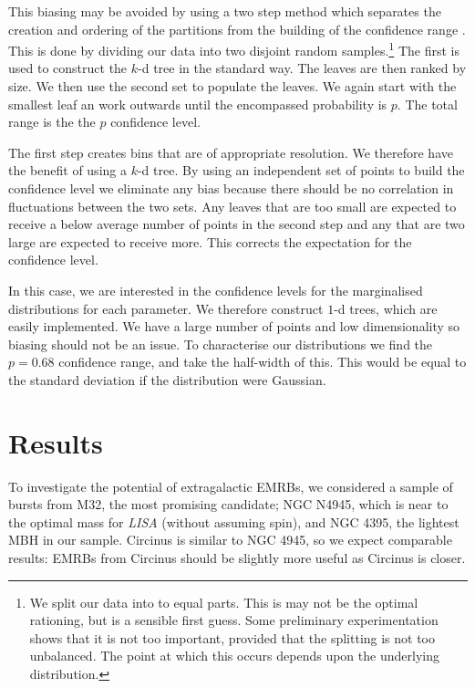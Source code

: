 \documentclass[useAMS,usedcolumn,usegraphicx,usenatbib]{mn2e}
\begin{document}
This biasing may be avoided by using a two step method which separates the creation and ordering of the partitions from the building of the confidence range \citep{Sidery2013}. This is done by dividing our data into two disjoint random samples.\footnote{We split our data into to equal parts. This is may not be the optimal rationing, but is a sensible first guess. Some preliminary experimentation shows that it is not too important, provided that the splitting is not too unbalanced. The point at which this occurs depends upon the underlying distribution.} The first is used to construct the $k$-d tree in the standard way. The leaves are then ranked by size. We then use the second set to populate the leaves. We again start with the smallest leaf an work outwards until the encompassed probability is $p$. The total range is the the $p$ confidence level.

The first step creates bins that are of appropriate resolution. We therefore have the benefit of using a $k$-d tree. By using an independent set of points to build the confidence level we eliminate any bias because there should be no correlation in fluctuations between the two sets. Any leaves that are too small are expected to receive a below average number of points in the second step and any that are two large are expected to receive more. This corrects the expectation for the confidence level.

In this case, we are interested in the confidence levels for the marginalised distributions for each parameter. We therefore construct $1$-d trees, which are easily implemented. We have a large number of points and low dimensionality so biasing should not be an issue. To characterise our distributions we find the $p = 0.68$ confidence range, and take the half-width of this. This would be equal to the standard deviation if the distribution were Gaussian.

\section{Results}\label{sec:Res}

To investigate the potential of extragalactic EMRBs, we considered a sample of bursts from M32, the most promising candidate; NGC N4945, which is near to the optimal mass for \textit{LISA} (without assuming spin), and NGC 4395, the lightest MBH in our sample. Circinus is similar to NGC 4945, so we expect comparable results: EMRBs from Circinus should be slightly more useful as Circinus is closer.
\end{document}
